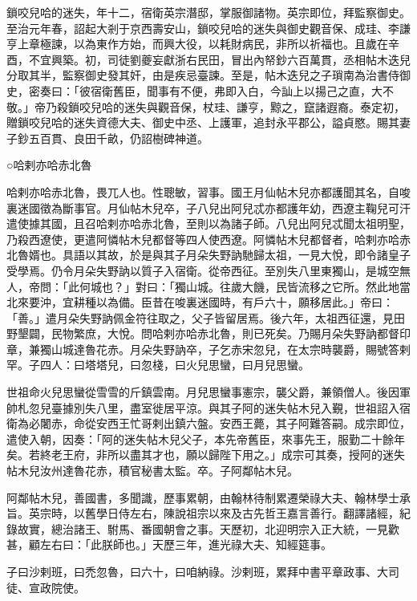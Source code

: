 \begin{pinyinscope}
 鎖咬兒哈的迷失，年十二，宿衛英宗潛邸，掌服御諸物。英宗即位，拜監察御史。至治元年春，詔起大剎于京西壽安山，鎖咬兒哈的迷失與御史觀音保、成珪、李謙亨上章極諫，以為東作方始，而興大役，以耗財病民，非所以祈福也。且歲在辛酉，不宜興築。初，司徒劉夔妄獻浙右民田，冒出內帑鈔六百萬貫，丞相帖木迭兒分取其半，監察御史發其奸，由是疾忌臺諫。至是，帖木迭兒之子瑣南為治書侍御史，密奏曰：「彼宿衛舊臣，聞事有不便，弗即入白，今訕上以揚己之直，大不敬。」帝乃殺鎖咬兒哈的迷失與觀音保，杖珪、謙亨，黥之，竄諸遐裔。泰定初，贈鎖咬兒哈的迷失資德大夫、御史中丞、上護軍，追封永平郡公，謚貞愍。賜其妻子鈔五百貫、良田千畝，仍詔樹碑神道。



 ○哈剌亦哈赤北魯



 哈剌亦哈赤北魯，畏兀人也。性聰敏，習事。國王月仙帖木兒亦都護聞其名，自唆裏迷國徵為斷事官。月仙帖木兒卒，子八兒出阿兒忒亦都護年幼，西遼主鞠兒可汗遣使據其國，且召哈剌亦哈赤北魯，至則以為諸子師。八兒出阿兒忒聞太祖明聖，乃殺西遼使，更遣阿憐帖木兒都督等四人使西遼。阿憐帖木兒都督者，哈剌亦哈赤北魯婿也。具語以其故，於是與其子月朵失野訥馳歸太祖，一見大悅，即令諸皇子受學焉。仍令月朵失野訥以質子入宿衛。從帝西征。至別失八里東獨山，是城空無人，帝問：「此何城也？」對曰：「獨山城。往歲大饑，民皆流移之它所。然此地當北來要沖，宜耕種以為備。臣昔在唆裏迷國時，有戶六十，願移居此。」帝曰：「善。」遣月朵失野訥佩金符往取之，父子皆留居焉。後六年，太祖西征還，見田野墾闢，民物繁庶，大悅。問哈剌亦哈赤北魯，則已死矣。乃賜月朵失野訥都督印章，兼獨山城達魯花赤。月朵失野訥卒，子乞赤宋忽兒，在太宗時襲爵，賜號答剌罕。子四人：曰塔塔兒，曰忽棧，曰火兒思蠻，曰月兒思蠻。



 世祖命火兒思蠻從雪雪的斤鎮雲南。月兒思蠻事憲宗，襲父爵，兼領僧人。後因軍帥札忽兒臺據別失八里，盡室徙居平涼。與其子阿的迷失帖木兒入覲，世祖詔入宿衛為必闍赤，命從安西王忙哥剌出鎮六盤。安西王薨，其子阿難答嗣。成宗即位，遣使入朝，因奏：「阿的迷失帖木兒父子，本先帝舊臣，來事先王，服勤二十餘年矣。若終老王府，非所以盡其才也，願以歸陛下用之。」成宗可其奏，授阿的迷失帖木兒汝州達魯花赤，積官秘書太監。卒。子阿鄰帖木兒。



 阿鄰帖木兒，善國書，多聞識，歷事累朝，由翰林待制累遷榮祿大夫、翰林學士承旨。英宗時，以舊學日侍左右，陳說祖宗以來及古先哲王嘉言善行。翻譯諸經，紀錄故實，總治諸王、駙馬、番國朝會之事。天歷初，北迎明宗入正大統，一見歡甚，顧左右曰：「此朕師也。」天歷三年，進光祿大夫、知經筵事。



 子曰沙剌班，曰禿忽魯，曰六十，曰咱納祿。沙剌班，累拜中書平章政事、大司徒、宣政院使。




\end{pinyinscope}
